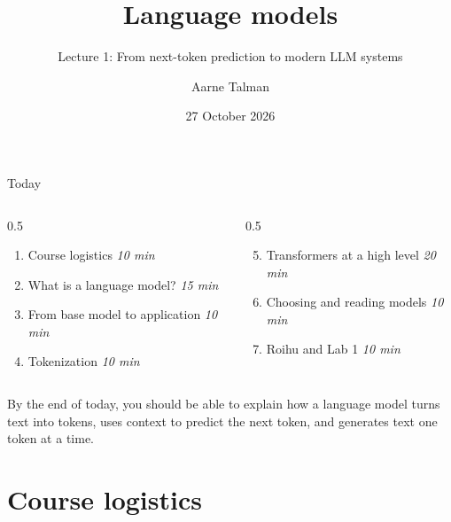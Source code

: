 \documentclass[aspectratio=169,10pt]{beamer}
\title{Language models}
\subtitle{Lecture 1: From next-token prediction to modern LLM systems}
\author{Aarne Talman}
\institute{\coursecode\ \textbar\ \coursename\ \textbar\ \courseinstitution}
\date{27 October 2026}
\begin{document}
\begin{frame}[plain,shrink=8]
  \titlepage
\end{frame}


\begin{frame}{Today}
  \begin{columns}[T]
    \begin{column}{0.5\textwidth}
      \begin{enumerate}
        \item Course logistics \hfill \textit{10 min}
        \item What is a language model? \hfill \textit{15 min}
        \item From base model to application \hfill \textit{10 min}
        \item Tokenization \hfill \textit{10 min}
      \end{enumerate}
    \end{column}
    \begin{column}{0.5\textwidth}
      \begin{enumerate}
        \setcounter{enumi}{4}
        \item Transformers at a high level \hfill \textit{20 min}
        \item Choosing and reading models \hfill \textit{10 min}
        \item Roihu and Lab 1 \hfill \textit{10 min}
      \end{enumerate}
    \end{column}
  \end{columns}
  \vfill
  \begin{takeaway}
    By the end of today, you should be able to explain how a language model
    turns text into tokens, uses context to predict the next token, and
    generates text one token at a time.
  \end{takeaway}
\end{frame}

\section{Course logistics}
\end{document}
